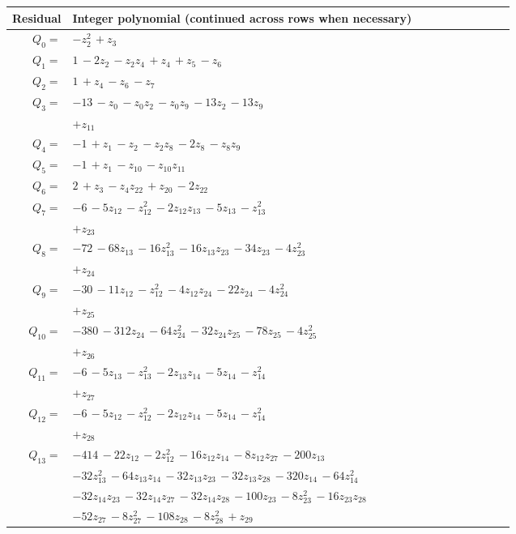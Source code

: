\begingroup\footnotesize
\setlength{\tabcolsep}{3pt}
\begin{longtable}{@{}r p{0.88\linewidth}@{}}
\toprule Residual & Integer polynomial (continued across rows when necessary)\\\midrule\endhead
$Q_{0}=$ & $-z_{2}^{2}\,+z_{3}$\\[5pt]
$Q_{1}=$ & $1\,-2z_{2}\,-z_{2}z_{4}\,+z_{4}\,+z_{5}\,-z_{6}$\\[5pt]
$Q_{2}=$ & $1\,+z_{4}\,-z_{6}\,-z_{7}$\\[5pt]
$Q_{3}=$ & $-13\,-z_{0}\,-z_{0}z_{2}\,-z_{0}z_{9}\,-13z_{2}\,-13z_{9}$\\
 & $+z_{11}$\\[5pt]
$Q_{4}=$ & $-1\,+z_{1}\,-z_{2}\,-z_{2}z_{8}\,-2z_{8}\,-z_{8}z_{9}$\\[5pt]
$Q_{5}=$ & $-1\,+z_{1}\,-z_{10}\,-z_{10}z_{11}$\\[5pt]
$Q_{6}=$ & $2\,+z_{3}\,-z_{4}z_{22}\,+z_{20}\,-2z_{22}$\\[5pt]
$Q_{7}=$ & $-6\,-5z_{12}\,-z_{12}^{2}\,-2z_{12}z_{13}\,-5z_{13}\,-z_{13}^{2}$\\
 & $+z_{23}$\\[5pt]
$Q_{8}=$ & $-72\,-68z_{13}\,-16z_{13}^{2}\,-16z_{13}z_{23}\,-34z_{23}\,-4z_{23}^{2}$\\
 & $+z_{24}$\\[5pt]
$Q_{9}=$ & $-30\,-11z_{12}\,-z_{12}^{2}\,-4z_{12}z_{24}\,-22z_{24}\,-4z_{24}^{2}$\\
 & $+z_{25}$\\[5pt]
$Q_{10}=$ & $-380\,-312z_{24}\,-64z_{24}^{2}\,-32z_{24}z_{25}\,-78z_{25}\,-4z_{25}^{2}$\\
 & $+z_{26}$\\[5pt]
$Q_{11}=$ & $-6\,-5z_{13}\,-z_{13}^{2}\,-2z_{13}z_{14}\,-5z_{14}\,-z_{14}^{2}$\\
 & $+z_{27}$\\[5pt]
$Q_{12}=$ & $-6\,-5z_{12}\,-z_{12}^{2}\,-2z_{12}z_{14}\,-5z_{14}\,-z_{14}^{2}$\\
 & $+z_{28}$\\[5pt]
$Q_{13}=$ & $-414\,-22z_{12}\,-2z_{12}^{2}\,-16z_{12}z_{14}\,-8z_{12}z_{27}\,-200z_{13}$\\
 & $-32z_{13}^{2}\,-64z_{13}z_{14}\,-32z_{13}z_{23}\,-32z_{13}z_{28}\,-320z_{14}\,-64z_{14}^{2}$\\
 & $-32z_{14}z_{23}\,-32z_{14}z_{27}\,-32z_{14}z_{28}\,-100z_{23}\,-8z_{23}^{2}\,-16z_{23}z_{28}$\\
 & $-52z_{27}\,-8z_{27}^{2}\,-108z_{28}\,-8z_{28}^{2}\,+z_{29}$\\[5pt]

\end{longtable}
